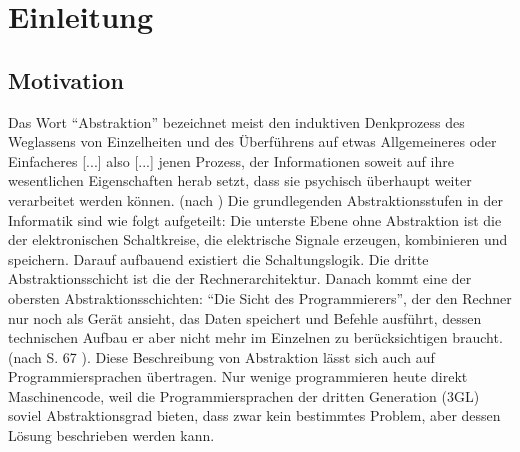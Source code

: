 \documentclass[11pt,english,ngerman, headsepline]{scrreprt}
\begin{document}
 




%
\tableofcontents{}

\pagestyle{scrheadings}    %



\chapter{Einleitung} 



\section{Motivation}

Das Wort “Abstraktion” bezeichnet meist den induktiven Denkprozess des
Weglassens von Einzelheiten und des Überführens auf etwas Allgemeineres oder
Einfacheres [...] also [...] jenen Prozess, der Informationen soweit auf ihre
wesentlichen Eigenschaften herab setzt, dass sie psychisch überhaupt weiter
verarbeitet werden können. (nach \cite{wikiAbsraktion}) Die grundlegenden
Abstraktionsstufen in der Informatik sind wie folgt aufgeteilt: Die unterste
Ebene ohne Abstraktion ist die der elektronischen Schaltkreise, die elektrische
Signale erzeugen, kombinieren und speichern. Darauf aufbauend existiert die
Schaltungslogik. Die dritte Abstraktionsschicht ist die der Rechnerarchitektur.
Danach kommt eine der obersten Abstraktionsschichten: “Die Sicht des
Programmierers”, der den Rechner nur noch als Gerät ansieht, das Daten speichert
und Befehle ausführt, dessen technischen Aufbau er aber nicht mehr im Einzelnen
zu berücksichtigen braucht. (nach S. 67 \cite{rechenberg2000informatik}). Diese
Beschreibung von Abstraktion lässt sich auch auf Programmiersprachen übertragen.
Nur wenige programmieren heute direkt Maschinencode, weil die
Programmiersprachen der dritten Generation (3GL) soviel Abstraktionsgrad bieten,
dass zwar kein bestimmtes Problem, aber dessen Lösung beschrieben werden kann.
\end{document}
